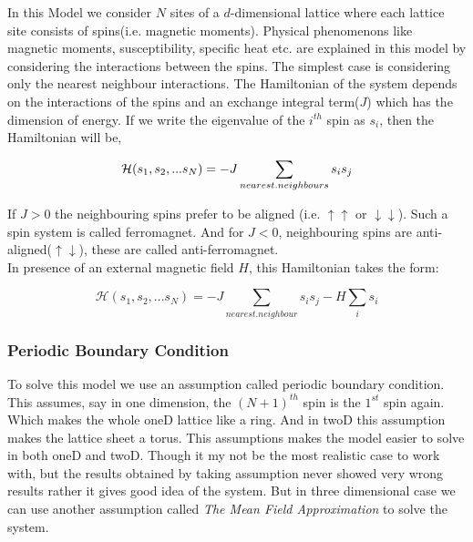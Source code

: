 \documentclass[24pt]{article}
\begin{document}
\begin{large}

In this Model we consider $N$ sites of a $d$-dimensional lattice where each lattice site consists of spins(i.e. magnetic moments). Physical phenomenons like magnetic moments, susceptibility, specific heat etc. are explained in this model by considering the interactions between the spins. The simplest case is considering only the nearest  neighbour interactions. The Hamiltonian of the system depends on the interactions of the spins and an exchange integral term($J$) which has the dimension of energy. If we write the eigenvalue of the $i^{th}$ spin as $s_i$, then the Hamiltonian will be,

\begin{equation}
\mathcal{H}(s_1,s_2,...s_N)=-J \sum_{{\small nearest.neighbours}} s_i s_j 
\end{equation}


If $J>0$ the neighbouring spins prefer to be aligned (i.e. $ \uparrow \uparrow$ or $ \downarrow \downarrow$). Such a spin system is called ferromagnet. And for $J<0$, neighbouring spins are anti-aligned($\uparrow \downarrow$), these are called anti-ferromagnet.  \\
In presence of an external magnetic field $H$, this Hamiltonian takes the form:

\begin{equation}
\mathcal{H}(s_1,s_2,...s_N)=-J \sum_{nearest.neighbour} s_i s_j - H \sum_{i} s_i
\end{equation}

\end{large}

\subsubsection{{\large \textbf{Periodic Boundary Condition}}}
{\large To solve this model we use an assumption called periodic boundary condition. This assumes, say in one dimension, the $(N+1)^{th}$ spin is the $1^{st}$ spin again. Which makes the whole oneD lattice like a ring. And in twoD this assumption makes the  lattice sheet a torus. This assumptions makes the model easier to solve in both oneD and twoD. Though it my not be the most realistic case to work with, but the results obtained by taking assumption never showed very wrong results rather it gives good idea of the system. But in three dimensional case we can use another assumption called \textit{The Mean Field Approximation } to solve the system.\\}
\end{document}
